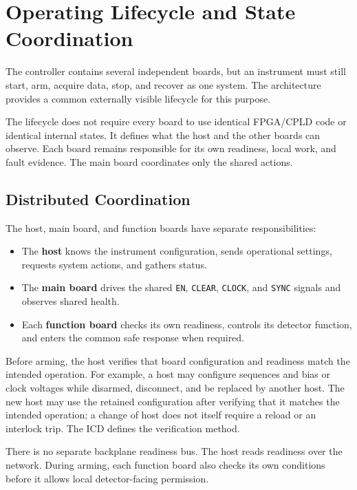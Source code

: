\chapter{Operating Lifecycle and State Coordination}
\label{chap:lifecycle}

The controller contains several independent boards, but an instrument must still start, arm, acquire data, stop, and recover as one system. The architecture provides a common externally visible lifecycle for this purpose.

The lifecycle does not require every board to use identical FPGA/CPLD code or identical internal states. It defines what the host and the other boards can observe. Each board remains responsible for its own readiness, local work, and fault evidence. The main board coordinates only the shared actions.

\section{Distributed Coordination}

The host, main board, and function boards have separate responsibilities:

\begin{itemize}
  \item The \textbf{host} knows the instrument configuration, sends operational settings, requests system actions, and gathers status.
  \item The \textbf{main board} drives the shared \texttt{EN}, \texttt{CLEAR}, \texttt{CLOCK}, and \texttt{SYNC} signals and observes shared health.
  \item Each \textbf{function board} checks its own readiness, controls its detector function, and enters the common safe response when required.
\end{itemize}

Before arming, the host verifies that board configuration and readiness match the intended operation. For example, a host may configure sequences and bias or clock voltages while disarmed, disconnect, and be replaced by another host. The new host may use the retained configuration after verifying that it matches the intended operation; a change of host does not itself require a reload or an interlock trip. The ICD defines the verification method.

There is no separate backplane readiness bus. The host reads readiness over the network. During arming, each function board also checks its own conditions before it allows local detector-facing permission.

